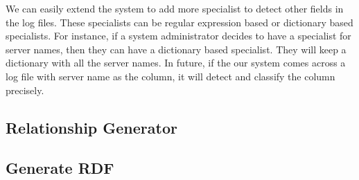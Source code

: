 We can easily extend the system to add more specialist to detect other fields in the log files. These specialists can be regular expression based or dictionary based specialists. For instance, if a system administrator decides to have a specialist for server names, then they can have a dictionary based specialist. They will keep a dictionary with all the server names. In future, if the our system comes across a log file with server name as the column, it will detect and classify the column precisely.
 

\subsection{Relationship Generator}
\label{Relationship Generator}

\subsection{Generate RDF}
\label{Generate RDF}